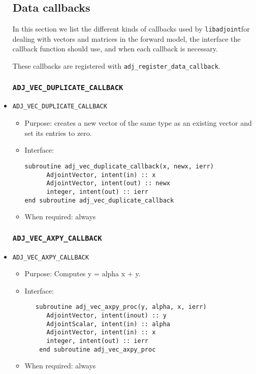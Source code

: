 \documentclass[10pt,authoryear]{elsarticle}
\newcommand{\libadjoint}[0]{{\texttt{libadjoint}}}
\begin{document}
\begin{itemize}
\subsection{Data callbacks}
In this section we list the different kinds of callbacks used by \libadjoint for dealing with
vectors and matrices in the forward model, the interface
the callback function should use, and when each callback is necessary.

These callbacks are registered with \texttt{adj\_register\_data\_callback}.

\subsubsection{\texttt{ADJ\_VEC\_DUPLICATE\_CALLBACK}}
\item \texttt{ADJ\_VEC\_DUPLICATE\_CALLBACK}
 \begin{itemize}
 \item Purpose: creates a new vector of the same type as an existing vector and set its entries to zero.
 \item Interface:
\begin{verbatim}
subroutine adj_vec_duplicate_callback(x, newx, ierr)
      AdjointVector, intent(in) :: x
      AdjointVector, intent(out) :: newx
      integer, intent(out) :: ierr
end subroutine adj_vec_duplicate_callback
\end{verbatim}
 \item When required: always
 \end{itemize}

\subsubsection{\texttt{ADJ\_VEC\_AXPY\_CALLBACK}}
\item \texttt{ADJ\_VEC\_AXPY\_CALLBACK}
 \begin{itemize}
 \item Purpose: Computes y = alpha x + y.
 \item Interface:
\begin{verbatim}
   subroutine adj_vec_axpy_proc(y, alpha, x, ierr)
      AdjointVector, intent(inout) :: y
      AdjointScalar, intent(in) :: alpha
      AdjointVector, intent(in) :: x
      integer, intent(out) :: ierr
    end subroutine adj_vec_axpy_proc
\end{verbatim}
 \item When required: always
 \end{itemize}


\end{itemize}
\end{document}
